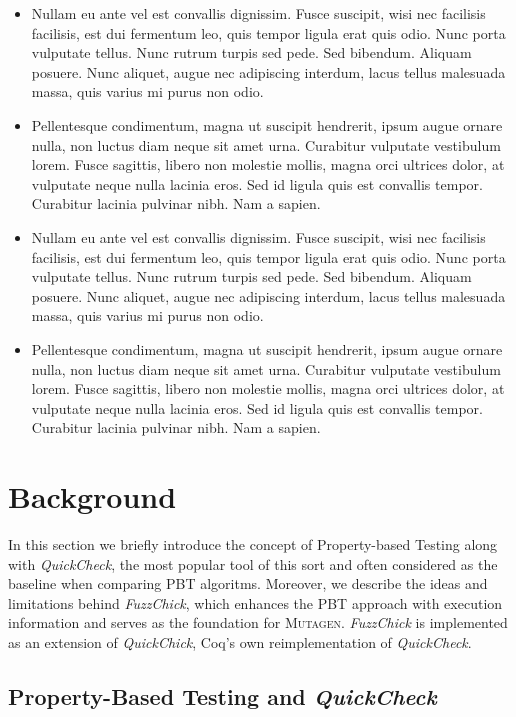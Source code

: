 \documentclass[acmsmall, anonymous]{acmart}
\newcommand{\quickcheck}{\textit{QuickCheck}\xspace}
\newcommand{\quickchick}{\textit{QuickChick}\xspace}
\newcommand{\fuzzchick}{\textit{FuzzChick}\xspace}
\newcommand{\mutagen}{\textsc{Mutagen}\xspace}
\begin{document}
\begin{itemize}
\item Nullam eu ante vel est convallis dignissim. Fusce suscipit, wisi nec
  facilisis facilisis, est dui fermentum leo, quis tempor ligula erat quis odio.
  Nunc porta vulputate tellus. Nunc rutrum turpis sed pede. Sed bibendum.
  Aliquam posuere. Nunc aliquet, augue nec adipiscing interdum, lacus tellus
  malesuada massa, quis varius mi purus non odio.
\item Pellentesque condimentum,
  magna ut suscipit hendrerit, ipsum augue ornare nulla, non luctus diam neque
  sit amet urna. Curabitur vulputate vestibulum lorem. Fusce sagittis, libero
  non molestie mollis, magna orci ultrices dolor, at vulputate neque nulla
  lacinia eros. Sed id ligula quis est convallis tempor. Curabitur lacinia
  pulvinar nibh. Nam a sapien.
\item Nullam eu ante vel est convallis dignissim. Fusce suscipit, wisi nec
  facilisis facilisis, est dui fermentum leo, quis tempor ligula erat quis odio.
  Nunc porta vulputate tellus. Nunc rutrum turpis sed pede. Sed bibendum.
  Aliquam posuere. Nunc aliquet, augue nec adipiscing interdum, lacus tellus
  malesuada massa, quis varius mi purus non odio.
\item Pellentesque condimentum, magna ut suscipit hendrerit, ipsum augue ornare
  nulla, non luctus diam neque sit amet urna. Curabitur vulputate vestibulum
  lorem. Fusce sagittis, libero non molestie mollis, magna orci ultrices dolor,
  at vulputate neque nulla lacinia eros. Sed id ligula quis est convallis
  tempor. Curabitur lacinia pulvinar nibh. Nam a sapien.
\end{itemize}


\section{Background}
\label{sec:background}

In this section we briefly introduce the concept of Property-based Testing along
with \quickcheck, the most popular tool of this sort and often considered as the
baseline when comparing PBT algoritms.
%
Moreover, we describe the ideas and limitations behind \fuzzchick, which
enhances the PBT approach with execution information and serves as the
foundation for \mutagen.
%
\fuzzchick is implemented as an extension of \quickchick, Coq's own
reimplementation of \quickcheck.

\subsection{Property-Based Testing and \quickcheck}
\end{document}

